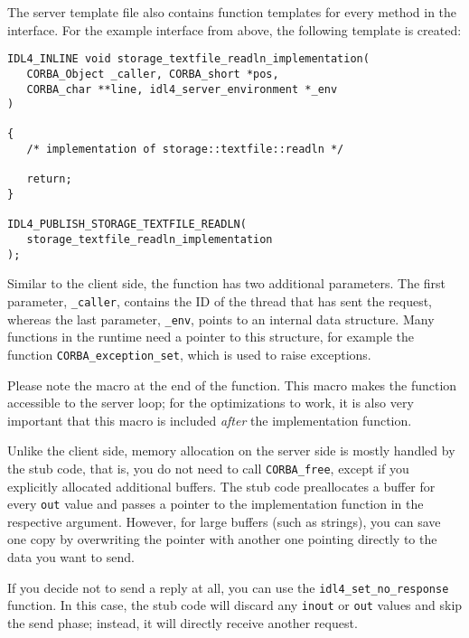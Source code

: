 The server template file also contains function templates for every method in
the interface. For the example interface from above, the following template
is created:

\begin{center}\begin{minipage}{13cm}\small\begin{verbatim}
IDL4_INLINE void storage_textfile_readln_implementation(
   CORBA_Object _caller, CORBA_short *pos, 
   CORBA_char **line, idl4_server_environment *_env
)

{
   /* implementation of storage::textfile::readln */
  
   return;
}

IDL4_PUBLISH_STORAGE_TEXTFILE_READLN(
   storage_textfile_readln_implementation
);
\end{verbatim}\end{minipage}\end{center}

Similar to the client side, the function has two additional parameters. The first
parameter, \texttt{\_caller}, contains the ID of the thread that has sent the
request, whereas the last parameter, \texttt{\_env}, points to an internal data
structure. Many functions in the \IDL runtime need a pointer to this structure,
for example the function \texttt{CORBA\_exception\_set}, which is used to 
raise exceptions.

Please note the macro at the end of the function. This macro makes the function
accessible to the server loop; for the optimizations to work, it is also very 
important that this macro is included \emph{after} the implementation function. 

Unlike the client side, memory allocation on the server side is mostly handled by
the stub code, that is, you do not need to call \texttt{CORBA\_free}, except if 
you explicitly allocated additional buffers. The stub code preallocates a buffer
for every \texttt{out} value and passes a pointer to the implementation 
function in the respective argument. However, for large buffers 
(such as strings), you can save one copy by overwriting the pointer with another
one pointing directly to the data you want to send.

If you decide not to send a reply at all, you can use the \texttt{idl4\_set\_no\_response}
function. In this case, the stub code will discard any \texttt{inout} or \texttt{out}
values and skip the send phase; instead, it will directly receive another request.
